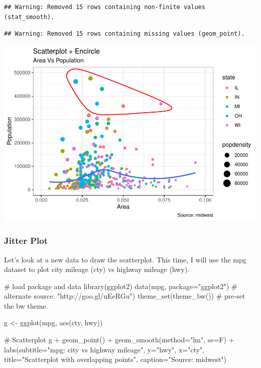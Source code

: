 \documentclass[a4paper]{article}
\newenvironment{Shaded}{}{}
\newcommand{\KeywordTok}[1]{\textcolor[rgb]{0.00,0.00,1.00}{#1}}
\newcommand{\DataTypeTok}[1]{#1}
\newcommand{\StringTok}[1]{\textcolor[rgb]{0.00,0.50,0.50}{#1}}
\newcommand{\CommentTok}[1]{\textcolor[rgb]{0.00,0.50,0.00}{#1}}
\newcommand{\OperatorTok}[1]{#1}
\newcommand{\NormalTok}[1]{#1}
\begin{document}
\begin{verbatim}
## Warning: Removed 15 rows containing non-finite values (stat_smooth).
\end{verbatim}

\begin{verbatim}
## Warning: Removed 15 rows containing missing values (geom_point).
\end{verbatim}

\includegraphics{M24-ggplot2_Gallery_files/figure-latex/unnamed-chunk-2-1.pdf}
\newpage

\subsubsection{Jitter Plot}\label{jitter-plot}

Let's look at a new data to draw the scatterplot. This time, I will use
the mpg dataset to plot city mileage (cty) vs highway mileage (hwy).

\begin{Shaded}
\begin{Highlighting}[]
\CommentTok{# load package and data}
\KeywordTok{library}\NormalTok{(ggplot2)}
\KeywordTok{data}\NormalTok{(mpg, }\DataTypeTok{package=}\StringTok{"ggplot2"}\NormalTok{) }\CommentTok{# alternate source: "http://goo.gl/uEeRGu")}
\KeywordTok{theme_set}\NormalTok{(}\KeywordTok{theme_bw}\NormalTok{())  }\CommentTok{# pre-set the bw theme.}

\NormalTok{g <-}\StringTok{ }\KeywordTok{ggplot}\NormalTok{(mpg, }\KeywordTok{aes}\NormalTok{(cty, hwy))}

\CommentTok{# Scatterplot}
\NormalTok{g }\OperatorTok{+}\StringTok{ }\KeywordTok{geom_point}\NormalTok{() }\OperatorTok{+}\StringTok{ }
\StringTok{  }\KeywordTok{geom_smooth}\NormalTok{(}\DataTypeTok{method=}\StringTok{"lm"}\NormalTok{, }\DataTypeTok{se=}\NormalTok{F) }\OperatorTok{+}
\StringTok{  }\KeywordTok{labs}\NormalTok{(}\DataTypeTok{subtitle=}\StringTok{"mpg: city vs highway mileage"}\NormalTok{, }
       \DataTypeTok{y=}\StringTok{"hwy"}\NormalTok{, }
       \DataTypeTok{x=}\StringTok{"cty"}\NormalTok{, }
       \DataTypeTok{title=}\StringTok{"Scatterplot with overlapping points"}\NormalTok{, }
       \DataTypeTok{caption=}\StringTok{"Source: midwest"}\NormalTok{)}
\end{Highlighting}
\end{Shaded}
\end{document}

